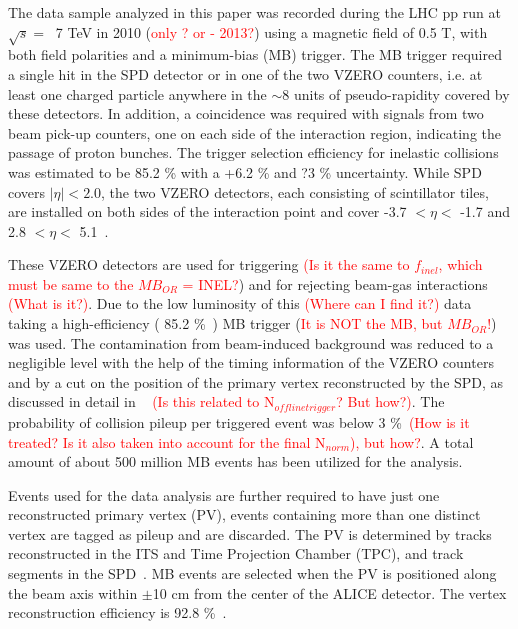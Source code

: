 \documentclass[ALICE,manyauthors]{cernphprep}
\newcommand{\sqs}{\ensuremath{\sqrt{s} =  \;\; }}
\newcommand{\red}{\textcolor{red}}
\begin{document}
The data sample analyzed in this paper was recorded during the LHC pp run
at \sqs 7 TeV in 2010 (\red{only ? or - 2013?}) using a magnetic field of 0.5 T, with both field polarities 
and a minimum-bias (MB) trigger. The MB trigger required a single hit in the SPD detector or in one of the two VZERO counters, 
i.e. at least one charged particle anywhere in the $\sim$8 units of pseudo-rapidity covered by these detectors. In addition, a coincidence was
required with signals from two beam pick-up counters, one on each side of the interaction region, indicating the passage of proton bunches. 
The trigger selection efficiency for inelastic collisions was estimated to be 85.2 \% with a +6.2 \%
and ?3 \% uncertainty.  While SPD covers $|\eta|<2.0$, the two VZERO detectors, each consisting of scintillator tiles, are installed on both 
sides of the interaction point and cover -3.7 $< \eta <$ -1.7 and 2.8 $< \eta <$ 5.1~\cite{cite:ALICE2010-ChargeMult,cite:pi0-2012,
cite:ALICE2015-InclPhot-pp}.

These VZERO detectors are used for triggering \red{(Is it the same to $f_{inel}$, which must be same to the $MB_{OR}$ = INEL?}) 
and for rejecting beam-gas interactions \red{(What is it?)}. 
Due to the low luminosity of this \red{(Where can I find it?)} data taking a high-efficiency ( 85.2 \%~\cite{cite:NSD})  
MB trigger (\red{It is NOT the MB, but $MB_{OR}$!}) was used. 
The contamination from beam-induced background was reduced  to a negligible level  with the help of the timing information of
the VZERO counters and by a cut on the position of the primary vertex reconstructed by the SPD, as discussed in detail in
~\cite{cite:ALICEPerformance} \red{(Is this related to N$_{offlinetrigger}$? But how?)}.  
The probability of collision pileup per triggered event was below 3 \%~\cite{cite:ALICE2015-InclPhot-pp}\red{(How is it treated? Is it also taken into 
account for the final N$_{norm}$), but how?}. A total amount of about 500 million MB events has been utilized for the analysis. 

Events used for the data analysis are further required to have just one reconstructed primary vertex (PV),
events containing more than one distinct  vertex are tagged as pileup and are discarded.  The PV is determined by tracks reconstructed in the ITS 
and Time Projection Chamber (TPC), and track segments in the SPD~\cite{cite:ALICEPerformance}. MB events are selected when 
the  PV is positioned along the beam axis within $\pm$10 cm from the center of the ALICE detector. 
The vertex reconstruction efficiency is 92.8 \%~\cite{cite:ALICE2015-InclPhot-pp}.
\end{document}
